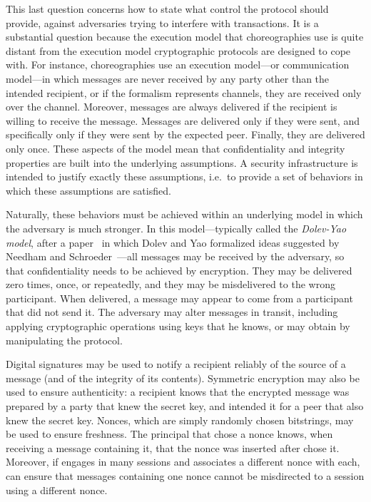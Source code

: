 \documentclass[copyright]{eptcs}
\begin{document}
This last question concerns how to state what control the protocol
should provide, against adversaries trying to interfere with
transactions.  It is a substantial question because the execution
model that choreographies use is quite distant from the execution
model cryptographic protocols are designed to cope with.  For
instance, choreographies use an execution model---or communication
model---in which messages are never received by any party other than
the intended recipient, or if the formalism represents channels, they
are received only over the channel.  Moreover, messages are always
delivered if the recipient is willing to receive the message.
Messages are delivered only if they were sent, and specifically only
if they were sent by the expected peer.  Finally, they are delivered
only once.  These aspects of the model mean that confidentiality and
integrity properties are built into the underlying assumptions.  A
security infrastructure is intended to justify exactly these
assumptions, i.e.~to provide a set of behaviors in which these
assumptions are satisfied.

Naturally, these behaviors must be achieved within an underlying model
in which the adversary is much stronger.  In this model---typically
called the \emph{Dolev-Yao model}, after a paper~\cite{DolevYao83} in
which Dolev and Yao formalized ideas suggested by Needham and
Schroeder~\cite{NeedhamSchroeder78}---all messages may be received by
the adversary, so that confidentiality needs to be achieved by
encryption.  They may be delivered zero times, once, or repeatedly,
and they may be misdelivered to the wrong participant.  When
delivered, a message may appear to come from a participant that did
not send it.  The adversary may alter messages in transit, including
applying cryptographic operations using keys that he knows, or may
obtain by manipulating the protocol.

Digital signatures may be used to notify a recipient reliably of the
source of a message (and of the integrity of its contents).  Symmetric
encryption may also be used to ensure authenticity:  a recipient knows
that the encrypted message was prepared by a party that knew the
secret key, and intended it for a peer that also knew the secret key.
Nonces, which are simply randomly chosen bitstrings, may be used to
ensure freshness.  The principal  that chose a nonce knows, when
receiving a message containing it, that the nonce was inserted after
 chose it.  Moreover, if  engages in many sessions and
associates a different nonce with each,  can ensure that messages
containing one nonce cannot be misdirected to a session using a
different nonce. 
\end{document}

